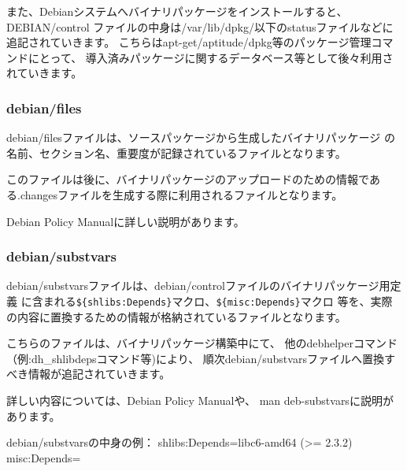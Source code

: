\documentclass[mingoth,a4paper]{jsarticle}
\begin{document}

 また、Debianシステムへバイナリパッケージをインストールすると、DEBIAN/control
ファイルの中身は/var/lib/dpkg/以下のstatusファイルなどに追記されていきます。
こちらはapt-get/aptitude/dpkg等のパッケージ管理コマンドにとって、
導入済みパッケージに関するデータベース等として後々利用されていきます。

\subsubsection{debian/files}

  debian/filesファイルは、ソースパッケージから生成したバイナリパッケージ
 の名前、セクション名、重要度が記録されているファイルとなります。

  このファイルは後に、バイナリパッケージのアップロードのための情報であ
 る.changesファイルを生成する際に利用されるファイルとなります。

 Debian Policy Manual\cite{debpolicy}に詳しい説明があります。

\subsubsection{debian/substvars}

 debian/substvarsファイルは、debian/controlファイルのバイナリパッケージ用定義
に含まれる\verb!${shlibs:Depends}!マクロ、\verb!${misc:Depends}!マクロ
等を、実際の内容に置換するための情報が格納されているファイルとなります。

 こちらのファイルは、バイナリパッケージ構築中にて、
他のdebhelperコマンド（例:dh\_shlibdepsコマンド等)により、
順次debian/substvarsファイルへ置換すべき情報が追記されていきます。

 詳しい内容については、Debian Policy Manual\cite{debpolicy}や、
man deb-substvarsに説明があります。

\begin{commandline}
debian/substvarsの中身の例：
shlibs:Depends=libc6-amd64 (>= 2.3.2)
misc:Depends=
\end{commandline}
\end{document}
